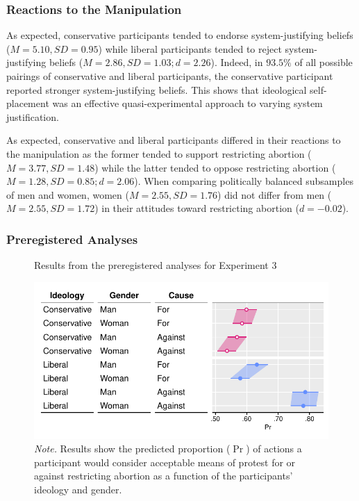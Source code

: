 \documentclass[12pt, letterpaper]{article}
\begin{document}
\hypertarget{reactions-to-the-manipulation-2}{%
\subsubsection{Reactions to the
Manipulation}\label{reactions-to-the-manipulation-2}}

As expected, conservative participants tended to endorse
system-justifying beliefs (\(M = 5.10, SD = 0.95\)) while liberal
participants tended to reject system-justifying beliefs
(\(M = 2.86, SD = 1.03; d = 2.26\)). Indeed, in \(93.5\%\) of all
possible pairings of conservative and liberal participants, the
conservative participant reported stronger system-justifying beliefs.
This shows that ideological self-placement was an effective
quasi-experimental approach to varying system justification.

As expected, conservative and liberal participants differed in their
reactions to the manipulation as the former tended to support
restricting abortion (\(M = 3.77, SD = 1.48\)) while the latter tended
to oppose restricting abortion (\(M = 1.28, SD = 0.85; d = 2.06\)). When
comparing politically balanced subsamples of men and women, women
(\(M = 2.55, SD = 1.76\)) did not differ from men
(\(M = 2.55, SD = 1.72\)) in their attitudes toward restricting abortion
(\(d = -0.02\)).

\hypertarget{preregistered-analyses-2}{%
\subsubsection{Preregistered Analyses}\label{preregistered-analyses-2}}

\begin{figure}[!t]
\centering
\caption{Results from the preregistered analyses for Experiment 3}
\includegraphics[scale=1]{../Experiment 3/figures/figure-6}
\caption*{\textit{Note.} Results show the predicted proportion ($\Pr$) of actions a participant would consider acceptable means of protest for or against restricting abortion as a function of the participants' ideology and gender.}
\label{fig:f6}
\end{figure}
\end{document}
